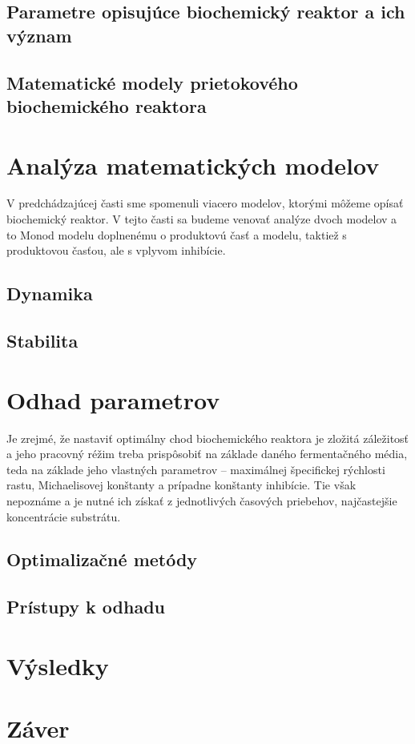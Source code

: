 \documentclass[fleqn]{article}
\begin{document}
\subsection{Parametre opisujúce biochemický reaktor a ich význam}


\subsection{Matematické modely prietokového biochemického reaktora}

\newpage

\section{Analýza matematických modelov}
V predchádzajúcej časti sme spomenuli viacero modelov, ktorými môžeme opísať biochemický reaktor. V tejto časti sa budeme venovať analýze dvoch modelov a to Monod modelu doplnenému o produktovú časť a modelu, taktiež s produktovou časťou, ale s vplyvom inhibície.

\subsection{Dynamika}


\subsection{Stabilita}

\newpage

\section{Odhad parametrov}
Je zrejmé, že nastaviť optimálny chod biochemického reaktora je zložitá záležitosť a jeho pracovný réžim treba prispôsobiť na základe daného fermentačného média, teda na základe jeho vlastných parametrov -- maximálnej špecifickej rýchlosti rastu, Michaelisovej konštanty a prípadne konštanty inhibície. Tie však nepoznáme a je nutné ich získať z jednotlivých časových priebehov, najčastejšie koncentrácie substrátu.

\subsection{Optimalizačné metódy}


\subsection{Prístupy k odhadu}

\newpage

\section{Výsledky}

\newpage

\section{Záver}

\newpage



\end{document}
